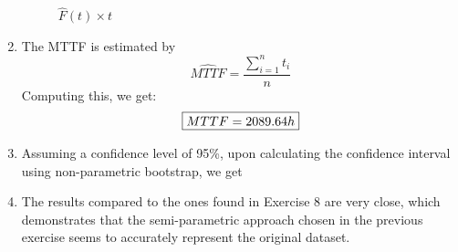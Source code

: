 \documentclass{article}
\begin{document}
\begin{enumerate}[label=(\alph*)]
\begin{figure}[H]
            \caption{$\hat{F}(t) \times t$}
            \label{fig:q9_lt}
        \end{figure}
        \item The MTTF is estimated by
        \[\widehat{MTTF} = \frac{\sum_{i=1}^{n}t_i}{n}\]
        Computing this, we get:
        \[\fbox{$MTTF = 2089.64h$}\]
        \item Assuming a confidence level of 95\%, upon calculating the confidence interval using non-parametric bootstrap, we get 
        \item The results compared to the ones found in Exercise 8 are very close, which demonstrates that the semi-parametric approach chosen in the previous exercise seems to accurately represent the original dataset.
    \end{enumerate}
    
\end{document}
